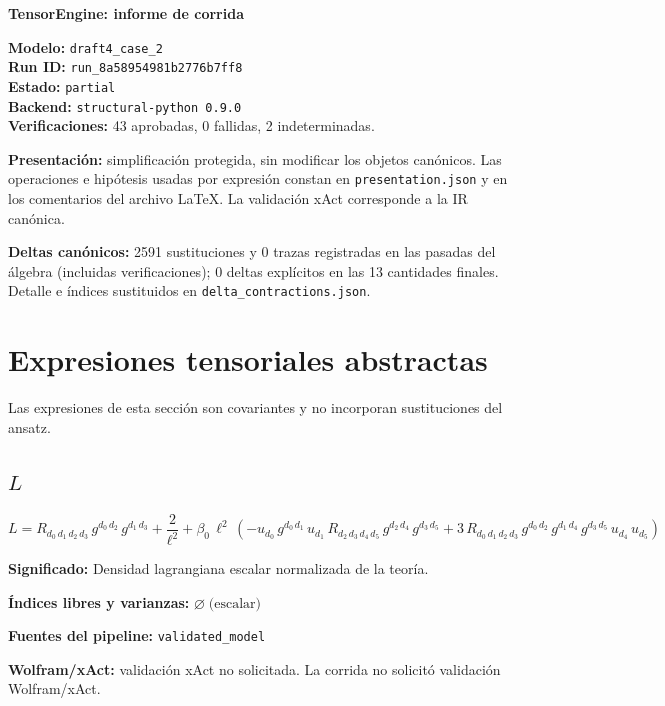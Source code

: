 \documentclass[11pt]{article}
\begin{document}
\begin{center}
{\Large\bfseries TensorEngine: informe de corrida}
\end{center}
\textbf{Modelo:} \texttt{draft4\_case\_2}\\
\textbf{Run ID:} \texttt{run\_8a58954981b2776b7ff8}\\
\textbf{Estado:} \texttt{partial}\\
\textbf{Backend:} \texttt{structural-python 0.9.0}\\
\textbf{Verificaciones:} 43 aprobadas, 0 fallidas, 2 indeterminadas.
\par\smallskip
\textbf{Presentación:} simplificación protegida, sin modificar los objetos canónicos. Las operaciones e hipótesis usadas por expresión constan en \texttt{presentation.json} y en los comentarios del archivo LaTeX. La validación xAct corresponde a la IR canónica.\par
\textbf{Deltas canónicos:} 2591 sustituciones y 0 trazas registradas en las pasadas del álgebra (incluidas verificaciones); 0 deltas explícitos en las 13 cantidades finales. Detalle e índices sustituidos en \texttt{delta\_contractions.json}.\par
\section*{Expresiones tensoriales abstractas}
Las expresiones de esta sección son covariantes y no incorporan sustituciones del ansatz.
\subsection*{$ L $}
\begin{dmath*}[breakdepth={5}]
L = R{}_{d_{0}\,d_{1}\,d_{2}\,d_{3}}\,g{}^{d_{0}\,d_{2}}\,g{}^{d_{1}\,d_{3}} + \frac{2}{{\ell}^{2}} + \beta_{0}\,{\ell}^{2}\,\left(-u{}_{d_{0}}\,g{}^{d_{0}\,d_{1}}\,u{}_{d_{1}}\,R{}_{d_{2}\,d_{3}\,d_{4}\,d_{5}}\,g{}^{d_{2}\,d_{4}}\,g{}^{d_{3}\,d_{5}} + 3\,R{}_{d_{0}\,d_{1}\,d_{2}\,d_{3}}\,g{}^{d_{0}\,d_{2}}\,g{}^{d_{1}\,d_{4}}\,g{}^{d_{3}\,d_{5}}\,u{}_{d_{4}}\,u{}_{d_{5}}\right)
\end{dmath*}
\par\vspace{1.2\baselineskip}\noindent
\begin{minipage}{\linewidth}
\textbf{Significado:} Densidad lagrangiana escalar normalizada de la teoría.\par
\textbf{Índices libres y varianzas:} $ \varnothing\;\text{(escalar)} $\par
\textbf{Fuentes del pipeline:} \texttt{validated\_model}\par
\textbf{Wolfram/xAct:} validación xAct no solicitada. La corrida no solicitó validación Wolfram/xAct.\par
\end{minipage}
\end{document}
